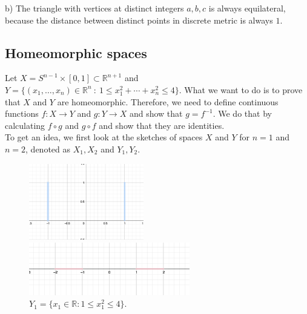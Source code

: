\documentclass[a4paper,11pt]{article}
\begin{document}
\noindent
b) The triangle with vertices at distinct integers $a, b, c$ is always equilateral, because the distance between distinct points in discrete metric is always $1$.


\subsection{Homeomorphic spaces}

Let $X = S^{n - 1} \times [0,1] \subset \mathbb{R}^{n+1}$ and $Y = \{ (x_1, \ldots, x_n) \in \mathbb{R}^n \ : \ 1 \leq x_1^2 + \cdots + x_n^2 \leq 4 \}$. What we want to do is to prove that $X$ and $Y$ are homeomorphic.
Therefore, we need to define continuous functions $f: X \to Y$ and $g: Y \to X$ and show that $g = f^{-1}$. We do that by calculating $f \circ g $ and $g \circ f$ and show that they are identities.
\\
To get an idea, we first look at the sketches of spaces $X$ and $Y$ for $n = 1$ and $n = 2$, denoted as $X_1, X_2$ and $Y_1, Y_2$.
\\

\begin{figure}[ht!]
     \begin{minipage}{0.5\textwidth}
         \centering
         \includegraphics[width=50mm]{X_n1.png}
         \caption{$X_1 = S^0 \times [0,1] \subset \mathbb{R}^2$.}
       \end{minipage}\hfill
     \begin{minipage}{0.5\textwidth}
         \centering
         \includegraphics[width=70mm]{Y_n1.png}
         \caption{$ Y_1 = \{ x_1 \in \mathbb{R} : 1 \leq x_1^2 \leq 4 \}$.}
       \end{minipage}\hfill
    \end{figure}
\end{document}
